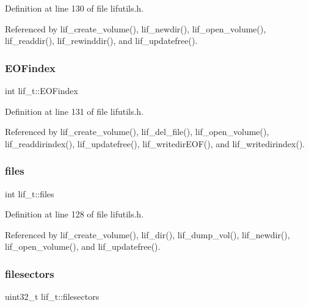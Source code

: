 Definition at line 130 of file lifutils.\+h.



Referenced by lif\+\_\+create\+\_\+volume(), lif\+\_\+newdir(), lif\+\_\+open\+\_\+volume(), lif\+\_\+readdir(), lif\+\_\+rewinddir(), and lif\+\_\+updatefree().

\mbox{\label{structlif__t_a68c465a879c7d4bd2279682185b6250e}} 
\subsubsection{\texorpdfstring{E\+O\+Findex}{EOFindex}}
{\footnotesize\ttfamily int lif\+\_\+t\+::\+E\+O\+Findex}



Definition at line 131 of file lifutils.\+h.



Referenced by lif\+\_\+create\+\_\+volume(), lif\+\_\+del\+\_\+file(), lif\+\_\+open\+\_\+volume(), lif\+\_\+readdirindex(), lif\+\_\+updatefree(), lif\+\_\+writedir\+E\+O\+F(), and lif\+\_\+writedirindex().

\mbox{\label{structlif__t_aceca398e2e3f6bcffe1593969544d546}} 
\subsubsection{\texorpdfstring{files}{files}}
{\footnotesize\ttfamily int lif\+\_\+t\+::files}



Definition at line 128 of file lifutils.\+h.



Referenced by lif\+\_\+create\+\_\+volume(), lif\+\_\+dir(), lif\+\_\+dump\+\_\+vol(), lif\+\_\+newdir(), lif\+\_\+open\+\_\+volume(), and lif\+\_\+updatefree().

\mbox{\label{structlif__t_a1223702cce63f879654d51773243643d}} 
\subsubsection{\texorpdfstring{filesectors}{filesectors}}
{\footnotesize\ttfamily uint32\+\_\+t lif\+\_\+t\+::filesectors}



